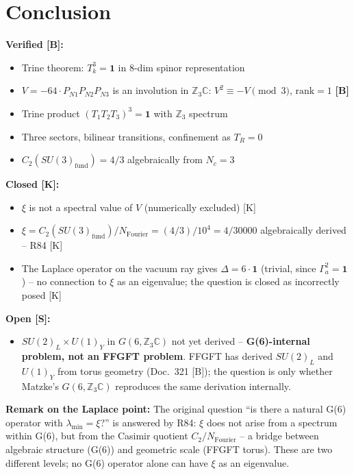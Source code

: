 \section{Conclusion}

\begin{keyresult}
\textbf{Verified [B]:}
\begin{itemize}
  \item Trine theorem: $T_k^3 = \mathbf{1}$ in 8-dim spinor representation
  \item $V = -64\cdot P_{N1}P_{N2}P_{N3}$ is an involution in $\mathbb{Z}_3\mathbb{C}$: $V^2 \equiv -V \pmod{3}$, $\mathrm{rank}=1$ \textbf{[B]}
  \item Trine product $(T_1T_2T_3)^3 = \mathbf{1}$ with $\mathbb{Z}_3$ spectrum
  \item Three sectors, bilinear transitions, confinement as $T_R = 0$
  \item $C_2(SU(3)_{\text{fund}}) = 4/3$ algebraically from $N_c = 3$
\end{itemize}
\textbf{Closed [K]:}
\begin{itemize}
  \item $\xi$ is not a spectral value of $V$ (numerically excluded) [K]
  \item $\xi = C_2(SU(3)_{\text{fund}})/N_{\text{Fourier}} = (4/3)/10^4
    = 4/30000$ algebraically derived -- R84 [K]
  \item The Laplace operator on the vacuum ray gives $\Delta = 6\cdot\mathbf{1}$
    (trivial, since $\Gamma_a^2 = \mathbf{1}$) -- no connection to $\xi$
    as an eigenvalue; the question is closed as incorrectly posed [K]
\end{itemize}
\textbf{Open [S]:}
\begin{itemize}
  \item $SU(2)_L\times U(1)_Y$ in $G(6,\mathbb{Z}_3\mathbb{C})$
    not yet derived -- \textbf{G(6)-internal problem, not an FFGFT problem}.
    FFGFT has derived $SU(2)_L$ and $U(1)_Y$ from torus geometry
    (Doc.~321 [B]); the question is only whether Matzke's
    $G(6,\mathbb{Z}_3\mathbb{C})$ reproduces the same derivation internally.
\end{itemize}
\textbf{Remark on the Laplace point:} The original question
``is there a natural G(6) operator with $\lambda_{\min} = \xi$?''
is answered by R84: $\xi$ does not arise from a spectrum within G(6),
but from the Casimir quotient $C_2/N_{\text{Fourier}}$ -- a bridge
between algebraic structure (G(6)) and geometric scale (FFGFT torus).
These are two different levels; no G(6) operator alone can have $\xi$
as an eigenvalue.
\end{keyresult}

